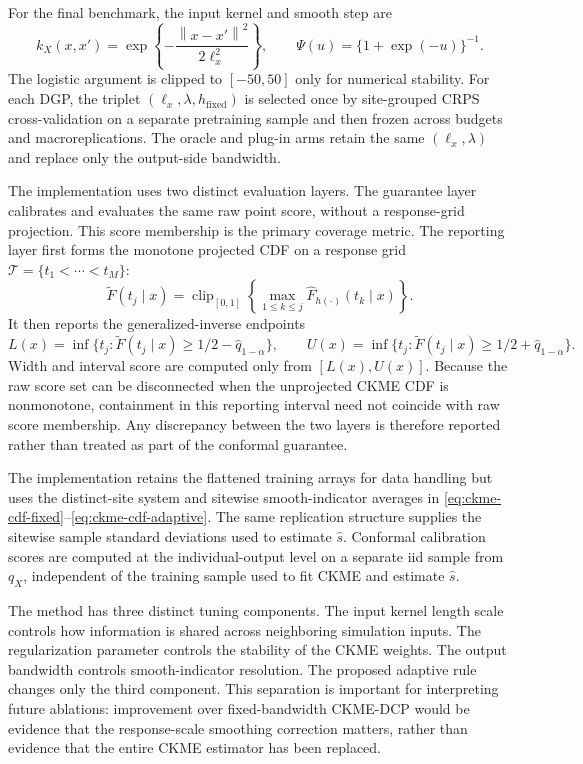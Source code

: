 \documentclass[11pt]{article}
\newcommand{\Tcal}{\mathcal T}
\newcommand{\norm}[1]{\left\lVert #1 \right\rVert}
\begin{document}
For the final benchmark, the input kernel and smooth step are
\[
  k_X(x,x')
  =
  \exp\left\{
  -\frac{\norm{x-x'}^2}{2\ell_x^2}
  \right\},
  \qquad
  \Psi(u)=\{1+\exp(-u)\}^{-1}.
\]
The logistic argument is clipped to \([-50,50]\) only for numerical
stability. For each DGP, the triplet
\((\ell_x,\lambda,h_{\mathrm{fixed}})\) is selected once by site-grouped
CRPS cross-validation on a separate pretraining sample and then frozen across
budgets and macroreplications. The oracle and plug-in arms retain the same
\((\ell_x,\lambda)\) and replace only the output-side bandwidth.

The implementation uses two distinct evaluation layers. The guarantee layer calibrates and evaluates the same raw point score, without a response-grid projection. This score membership is the primary coverage metric. The reporting layer first forms the monotone projected CDF on a response grid \(\Tcal=\{t_1<\cdots<t_M\}\):
\[
  \widetilde F(t_j\mid x)
  =
  \operatorname{clip}_{[0,1]}
  \left\{\max_{1\le k\le j}
  \widehat F_{h(\cdot)}(t_k\mid x)\right\}.
\]
It then reports the generalized-inverse endpoints
\[
  L(x)=\inf\{t_j:\widetilde F(t_j\mid x)\ge 1/2-\widehat q_{1-\alpha}\},
  \qquad
  U(x)=\inf\{t_j:\widetilde F(t_j\mid x)\ge 1/2+\widehat q_{1-\alpha}\}.
\]
Width and interval score are computed only from \([L(x),U(x)]\). Because the raw score set can be disconnected when the unprojected CKME CDF is nonmonotone, containment in this reporting interval need not coincide with raw score membership. Any discrepancy between the two layers is therefore reported rather than treated as part of the conformal guarantee.

The implementation retains the flattened training arrays for data handling but uses the distinct-site system and sitewise smooth-indicator averages in \eqref{eq:ckme-cdf-fixed}--\eqref{eq:ckme-cdf-adaptive}. The same replication structure supplies the sitewise sample standard deviations used to estimate \(\widehat s\). Conformal calibration scores are computed at the individual-output level on a separate iid sample from \(q_X\), independent of the training sample used to fit CKME and estimate \(\widehat s\).

The method has three distinct tuning components. The input kernel length scale controls how information is shared across neighboring simulation inputs. The regularization parameter controls the stability of the CKME weights. The output bandwidth controls smooth-indicator resolution. The proposed adaptive rule changes only the third component. This separation is important for interpreting future ablations: improvement over fixed-bandwidth CKME-DCP would be evidence that the response-scale smoothing correction matters, rather than evidence that the entire CKME estimator has been replaced.
\end{document}
